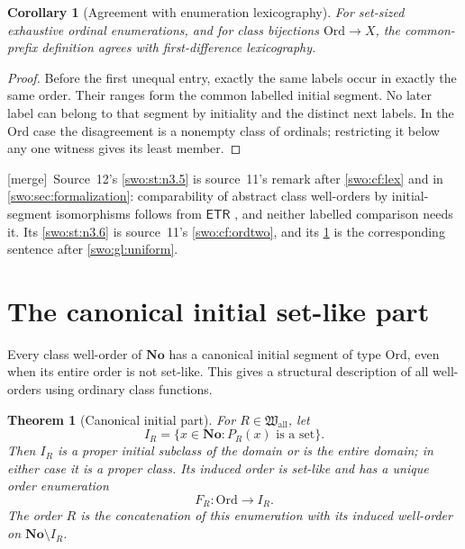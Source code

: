 \documentclass[11pt]{article}
\newtheorem{theorem}{Theorem}[section]
\newtheorem{corollary}[corollary]{Corollary}
\theoremstyle{definition}
\theoremstyle{remark}
\newcommand{\No}{\mathbf{No}}
\newcommand{\Ord}{\mathrm{Ord}}
\newcommand{\Hall}{\mathfrak W_{\mathrm{all}}}
\newcommand{\ETR}{\mathsf{ETR}}
\newcommand{\merge}{\textsf{[merge]}}
\begin{document}
\begin{corollary}[Agreement with enumeration lexicography]\label{swo:st:n3.7}
For set-sized exhaustive ordinal enumerations, and for class bijections
$\Ord\to X$, the common-prefix definition agrees with first-difference
lexicography.
\end{corollary}
\begin{proof}
Before the first unequal entry, exactly the same labels occur in exactly
the same order. Their ranges form the common labelled initial segment.
No later label can belong to that segment by initiality and the distinct
next labels. In the $\Ord$ case the disagreement is a nonempty class of
ordinals; restricting it below any one witness gives its least member.
\end{proof}


\merge\ Source~12's \cref{swo:st:n3.5} is source~11's remark after
\cref{swo:cf:lex} and in \cref{swo:sec:formalization}: comparability of
abstract class well-orders by initial-segment isomorphisms follows from $\ETR$
\cite{HamkinsWoodin}, and neither labelled comparison needs it. Its
\cref{swo:st:n3.6} is source~11's \cref{swo:cf:ordtwo}, and its
\cref{swo:st:n3.7} is the corresponding sentence after
\cref{swo:gl:uniform}.

\section{The canonical initial set-like part}
\label{swo:cf:decomposition}

Every class well-order of \(\No\) has a canonical initial segment of
type \(\Ord\), even when its entire order is not set-like.  This gives
a structural description of all well-orders using ordinary class functions.

\begin{theorem}[Canonical initial part]
\label{swo:cf:core}
For \(R\in\Hall\), let
\[
 I_R=\{x\in\No:P_R(x)\text{ is a set}\}.
\]
Then \(I_R\) is a proper initial subclass of the domain or is the entire
domain; in either case it is a proper class.  Its induced order is set-like
and has a unique order enumeration
\[
 F_R:\Ord\longrightarrow I_R.
\]
The order \(R\) is the concatenation of this enumeration with its induced
well-order on \(\No\setminus I_R\).
\end{theorem}
\end{document}
